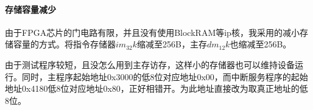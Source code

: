 \documentclass[main.tex]{subfiles}
\begin{document}
\paragraph{存储容量减少}
由于FPGA芯片的门电路有限，并且没有使用BlockRAM等ip核，我采用的减小存储容量的方式。将指令存储器$im_32k$缩减至256B，主存$dm_12k$也缩减至256B。

由于测试程序较短，且没怎么用到主存访存，这样小的存储器也可以维持设备运行。同时，主程序起始地址0x3000的低8位对应地址0x00，而中断服务程序的起始地址0x4180低8位对应地址0x80，正好相错开。为此地址直接改为取真正地址的低8位。

\clearpage

\begin{figure}[h]
\end{figure}
\clearpage
\end{document}
